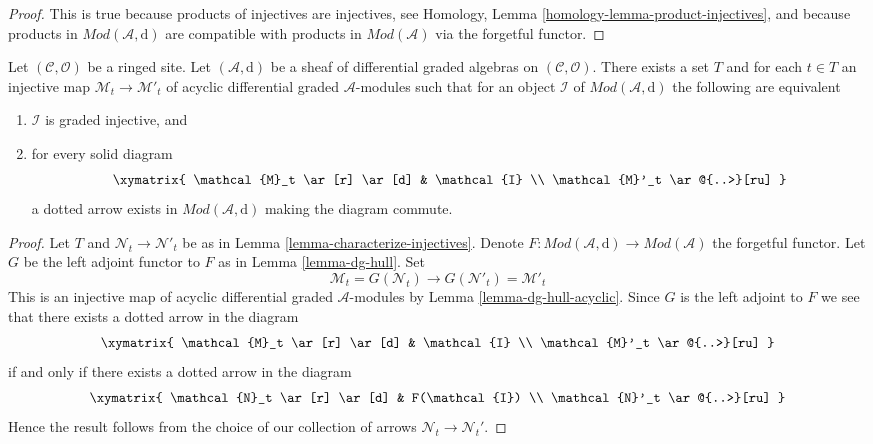 \begin{proof}
This is true because products of injectives are injectives, see
Homology, Lemma \ref{homology-lemma-product-injectives}, and
because products in
$\textit{Mod}(\mathcal{A}, \text{d})$ are compatible with
products in $\textit{Mod}(\mathcal{A})$ via the forgetful functor.
\end{proof}

\begin{lemma}
\label{lemma-characterize-graded-injectives-in-dg}
Let $(\mathcal{C}, \mathcal{O})$ be a ringed site.
Let $(\mathcal{A}, \text{d})$
be a sheaf of differential graded algebras on $(\mathcal{C}, \mathcal{O})$.
There exists a set $T$ and for each $t \in T$ an injective map
$\mathcal{M}_t \to \mathcal{M}'_t$ of
acyclic differential graded $\mathcal{A}$-modules
such that for an object $\mathcal{I}$ of $\textit{Mod}(\mathcal{A}, \text{d})$
the following are equivalent
\begin{enumerate}
\item $\mathcal{I}$ is graded injective, and
\item for every solid diagram
$$
\xymatrix{
\mathcal{M}_t \ar[r] \ar[d] & \mathcal{I} \\
\mathcal{M}'_t \ar@{..>}[ru]
}
$$
a dotted arrow exists in $\textit{Mod}(\mathcal{A}, \text{d})$
making the diagram commute.
\end{enumerate}
\end{lemma}

\begin{proof}
Let $T$ and $\mathcal{N}_t \to \mathcal{N}'_t$ be as in
Lemma \ref{lemma-characterize-injectives}.
Denote $F : \textit{Mod}(\mathcal{A}, \text{d}) \to \textit{Mod}(\mathcal{A})$
the forgetful functor.
Let $G$ be the left adjoint functor to
$F$ as in Lemma \ref{lemma-dg-hull}. Set
$$
\mathcal{M}_t = G(\mathcal{N}_t) \to
G(\mathcal{N}'_t) = \mathcal{M}'_t
$$
This is an injective map of acyclic differential graded
$\mathcal{A}$-modules by Lemma \ref{lemma-dg-hull-acyclic}.
Since $G$ is the left adjoint to $F$ we see that
there exists a dotted arrow in the diagram
$$
\xymatrix{
\mathcal{M}_t \ar[r] \ar[d] & \mathcal{I} \\
\mathcal{M}'_t \ar@{..>}[ru]
}
$$
if and only if there exists a dotted arrow in the diagram
$$
\xymatrix{
\mathcal{N}_t \ar[r] \ar[d] & F(\mathcal{I}) \\
\mathcal{N}'_t \ar@{..>}[ru]
}
$$
Hence the result follows from the choice of our
collection of arrows $\mathcal{N}_t \to \mathcal{N}_t'$.
\end{proof}


